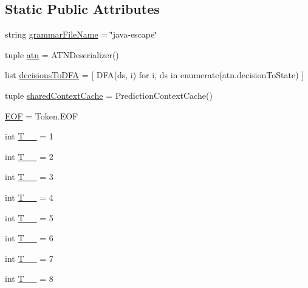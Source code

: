 \subsection*{Static Public Attributes}
\begin{DoxyCompactItemize}
\item 
string \hyperlink{class_prolog_rules_parser_1_1_prolog_rules_parser_a15377f7b025a77756d36114c83a91004}{grammar\+File\+Name} = \char`\"{}java-\/escape\char`\"{}
\item 
tuple \hyperlink{class_prolog_rules_parser_1_1_prolog_rules_parser_af3e5e19ff8bfc25f72bba8323d5b2e4a}{atn} = A\+T\+N\+Deserializer()
\item 
list \hyperlink{class_prolog_rules_parser_1_1_prolog_rules_parser_a61692146dafe00c2cf0d4ab5938c9c68}{decisions\+To\+D\+F\+A} = \mbox{[} D\+F\+A(ds, i) for i, ds in enumerate(atn.\+decision\+To\+State) \mbox{]}
\item 
tuple \hyperlink{class_prolog_rules_parser_1_1_prolog_rules_parser_abcc83c78b7cb5aff6b2cc54f5d33f143}{shared\+Context\+Cache} = Prediction\+Context\+Cache()
\item 
\hyperlink{class_prolog_rules_parser_1_1_prolog_rules_parser_a4b8e8403ff8eb09e1c7b694078f765b2}{E\+O\+F} = Token.\+E\+O\+F
\item 
int \hyperlink{class_prolog_rules_parser_1_1_prolog_rules_parser_a4cb5c955b91ccf5dc36ad6db7202dcce}{T\+\_\+\+\_} = 1
\item 
int \hyperlink{class_prolog_rules_parser_1_1_prolog_rules_parser_a53e7558944feb7cfe1e8bfb1767384ef}{T\+\_\+\+\_} = 2
\item 
int \hyperlink{class_prolog_rules_parser_1_1_prolog_rules_parser_ab1468d401c196881a49f2600042d6d64}{T\+\_\+\+\_} = 3
\item 
int \hyperlink{class_prolog_rules_parser_1_1_prolog_rules_parser_aece390dc6b10828f2a0f04d0d47a8b57}{T\+\_\+\+\_} = 4
\item 
int \hyperlink{class_prolog_rules_parser_1_1_prolog_rules_parser_a844dee3952dd7f26e6b3dcb345e22a91}{T\+\_\+\+\_} = 5
\item 
int \hyperlink{class_prolog_rules_parser_1_1_prolog_rules_parser_a4f48ff3491d8e3fbe7075caf04d8e006}{T\+\_\+\+\_} = 6
\item 
int \hyperlink{class_prolog_rules_parser_1_1_prolog_rules_parser_a2d9aeabd6a653e6300aa32084c9f4983}{T\+\_\+\+\_} = 7
\item 
int \hyperlink{class_prolog_rules_parser_1_1_prolog_rules_parser_ab7ff2effb1ea8358d127c79c272e68c2}{T\+\_\+\+\_} = 8

\end{DoxyCompactItemize}

